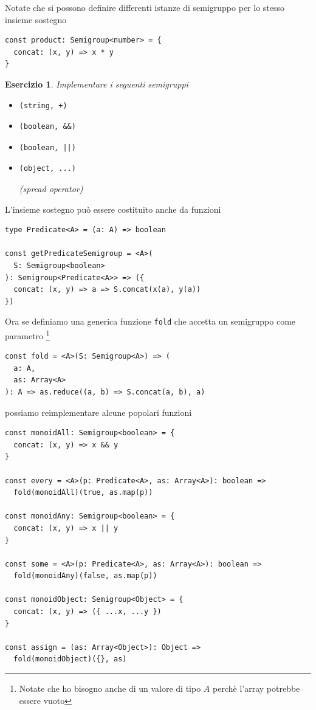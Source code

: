 \documentclass[12pt]{article}
\newtheorem{exercise}{Esercizio}[section]
\begin{document}
Notate che si possono definire differenti istanze di semigruppo per lo stesso insieme sostegno

\begin{verbatim}
const product: Semigroup<number> = {
  concat: (x, y) => x * y
}
\end{verbatim}

\begin{exercise}
Implementare i seguenti semigruppi
\begin{itemize}
  \item \begin{verbatim}(string, +)\end{verbatim}
  \item \begin{verbatim}(boolean, &&)\end{verbatim}
  \item \begin{verbatim}(boolean, ||)\end{verbatim}
  \item \begin{verbatim}(object, ...)\end{verbatim} (spread operator)
\end{itemize}
\end{exercise}

L'insieme sostegno può essere costituito anche da funzioni

\begin{verbatim}
type Predicate<A> = (a: A) => boolean

const getPredicateSemigroup = <A>(
  S: Semigroup<boolean>
): Semigroup<Predicate<A>> => ({
  concat: (x, y) => a => S.concat(x(a), y(a))
})
\end{verbatim}

Ora se definiamo una generica funzione \texttt{fold} che accetta un semigruppo come parametro
\footnote{Notate che ho bisogno anche di un valore di tipo $A$ perchè l'array potrebbe essere vuoto}

\begin{verbatim}
const fold = <A>(S: Semigroup<A>) => (
  a: A,
  as: Array<A>
): A => as.reduce((a, b) => S.concat(a, b), a)
\end{verbatim}

possiamo reimplementare alcune popolari funzioni

\begin{verbatim}
const monoidAll: Semigroup<boolean> = {
  concat: (x, y) => x && y
}

const every = <A>(p: Predicate<A>, as: Array<A>): boolean =>
  fold(monoidAll)(true, as.map(p))

const monoidAny: Semigroup<boolean> = {
  concat: (x, y) => x || y
}

const some = <A>(p: Predicate<A>, as: Array<A>): boolean =>
  fold(monoidAny)(false, as.map(p))

const monoidObject: Semigroup<Object> = {
  concat: (x, y) => ({ ...x, ...y })
}

const assign = (as: Array<Object>): Object =>
  fold(monoidObject)({}, as)
\end{verbatim}
\end{document}

